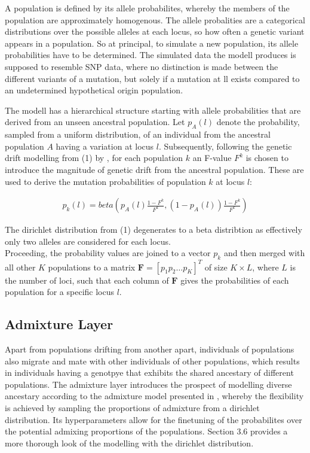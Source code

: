 \documentclass[a4paper, 11pt]{article}
\begin{document}
A population is defined by its allele probabilites, whereby the members of the population are approximately homogenous. The allele probalities are a categorical distributions over the possible alleles at each locus, so how often a genetic variant appears in a population. So at principal, to simulate a new population, its allele probabilities have to be determined. The simulated data the modell produces is supposed to resemble SNP data, where no distinction is made between the different variants of a mutation, but solely if a mutation at ll exists compared to an undetermined hypothetical origin population.

The modell has a hierarchical structure starting with allele probabilities that are derived from an unseen ancestral population. Let $p_{A}(l)$ denote the probability, sampled from a uniform distribution, of an individual from the ancestral population $A$ having a variation at locus $l$. Subsequently, following the genetic drift modelling from (1) by \cite{falush2003inference}, for each population $k$ an F-value $F^{k}$ is chosen to introduce the magnitude of genetic drift from the ancestral population. These are used to derive the mutation probabilities of population $k$ at locus $l$:

\begin{align}
p_{k}(l) = beta(p_{A}(l) \frac{1 - F^k}{F^k}, (1-p_{A}(l)) \frac{1 - F^k}{F^k})
\end{align}

The dirichlet distribution from (1) degenerates to a beta distribtion as effectively only two alleles are considered for each locus. \\

Proceeding, the probability values are joined to a vector $p_k$ and then merged with all other $K$ populations to a matrix $\mathbf{F} = [p_1 p_2 \ldots p_K]^T$ of size $K \times L$, where $L$ is the number of loci, such that each column of $\mathbf{F}$ gives the probabilities of each population for a specific locus $l$. \\

\subsection{Admixture Layer}

Apart from populations drifting from another apart, individuals of populations also migrate and mate with other individuals of other populations, which results in individuals having a genotpye that exhibits the shared ancestary of different populations. The admixture layer introduces the prospect of modelling diverse ancestary according to the admixture model presented in \cite{pritchard2000inference}, whereby the flexibility is achieved by sampling the proportions of admixture from a dirichlet distribution. Its hyperparameters allow for the finetuning of the probabilites over the potential admixing proportions of the populations. Section 3.6 provides a more thorough look of the modelling with the dirichlet distribution.
\end{document}
